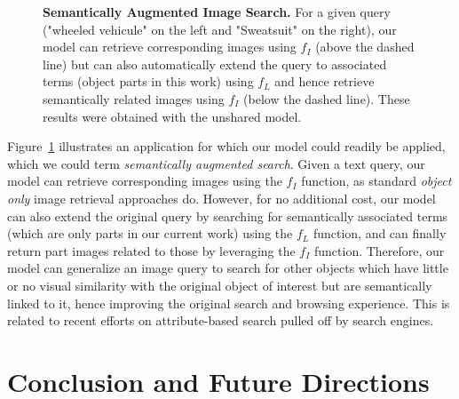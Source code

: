 \begin{figure}
  \begin{center}
    \caption[Semantically Augmented Image Search]{\label{fig:sem_search}{\bf Semantically Augmented Image Search.} {\small For a given query 
    ("wheeled vehicule" on the left and "Sweatsuit" on the right), our model can retrieve corresponding images
    using $f_{I}$ (above the dashed line) but can also automatically extend the query to associated terms 
    (object parts in this work) using $f_{L}$ and hence retrieve semantically related images using $f_{I}$ 
    (below the dashed line). These results were obtained with the unshared model.}}
    \end{center}
\end{figure}


Figure~\ref{fig:sem_search} illustrates an application for which our model could readily be applied, which 
we could term {\it semantically augmented search}. Given a text query, our model can retrieve corresponding 
images using the $f_I$ function, as standard {\it object only} image retrieval approaches do.
However, for no additional cost, 
our model can also extend the original query by searching for semantically associated terms (which are only parts in our current work) 
using the $f_L$ function, and can finally return part images related to those by leveraging the $f_I$ function.
%
Therefore, our model can generalize an image query to search for other objects which have little 
or no visual similarity with the original object of interest but are semantically linked to it, hence improving the original search and browsing experience.
%
This is related to recent efforts on attribute-based search pulled off by search engines.

\section{Conclusion and Future Directions} \label{conclusion}

